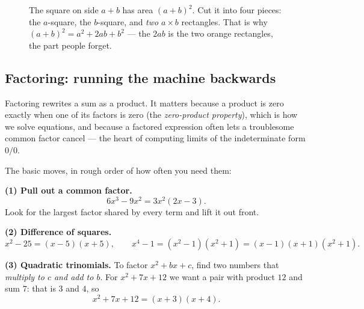 \begin{figure}[H]
\centering
{}
\caption{The square on side $a+b$ has area $(a+b)^2$. Cut it into four pieces:
the $a$-square, the $b$-square, and \emph{two} $a\times b$ rectangles. That is why
$(a+b)^2 = a^2 + 2ab + b^2$ --- the $2ab$ is the two orange rectangles, the part
people forget.}
\label{ch40:fig-square}
\end{figure}

\subsection{Factoring: running the machine backwards}

Factoring rewrites a sum as a product. It matters because a product is zero
exactly when one of its factors is zero (the \emph{zero-product property}), which
is how we solve equations, and because a factored expression often lets a
troublesome common factor cancel --- the heart of computing limits of the
indeterminate form $0/0$.

The basic moves, in rough order of how often you need them:

\textbf{(1) Pull out a common factor.}
\[
  6x^3 - 9x^2 = 3x^2(2x - 3).
\]
Look for the largest factor shared by every term and lift it out front.

\textbf{(2) Difference of squares.}
\[
  x^2 - 25 = (x-5)(x+5), \qquad x^4 - 1 = (x^2-1)(x^2+1) = (x-1)(x+1)(x^2+1).
\]

\textbf{(3) Quadratic trinomials.} To factor $x^2 + bx + c$, find two numbers that
\emph{multiply to $c$ and add to $b$}. For $x^2 + 7x + 12$ we want a pair with
product $12$ and sum $7$: that is $3$ and $4$, so
\[
  x^2 + 7x + 12 = (x+3)(x+4).
\]

